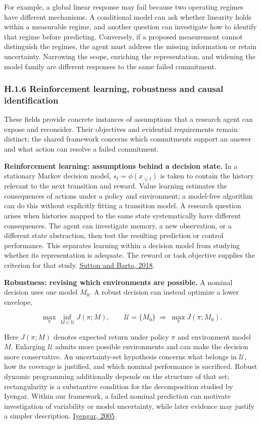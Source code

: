 \documentclass[11pt,a4paper]{article}
\begin{document}
For example, a global linear response may fail because two operating regimes have different mechanisms. A conditional model can ask whether linearity holds within a measurable regime, and another question can investigate how to identify that regime before predicting. Conversely, if a proposed measurement cannot distinguish the regimes, the agent must address the missing information or retain uncertainty. Narrowing the scope, enriching the representation, and widening the model family are different responses to the same failed commitment.


\subsubsection*{H.1.6 Reinforcement learning, robustness and causal identification}

These fields provide concrete instances of assumptions that a research agent can expose and reconsider. Their objectives and evidential requirements remain distinct; the shared framework concerns which commitments support an answer and what action can resolve a failed commitment.


\textbf{Reinforcement learning: assumptions behind a decision state.} In a stationary Markov decision model, \(s_t=\phi(x_{\leq t})\) is taken to contain the history relevant to the next transition and reward. Value learning estimates the consequences of actions under a policy and environment; a model-free algorithm can do this without explicitly fitting a transition model. A research question arises when histories mapped to the same state systematically have different consequences. The agent can investigate memory, a new observation, or a different state abstraction, then test the resulting prediction or control performance. This separates learning within a decision model from studying whether its representation is adequate. The reward or task objective supplies the criterion for that study. \href{https://mitpress.mit.edu/9780262039246/reinforcement-learning/}{Sutton and Barto, 2018}.


\textbf{Robustness: revising which environments are possible.} A nominal decision uses one model \(M_0\). A robust decision can instead optimize a lower envelope,


\[
\max_\pi\inf_{M\in\mathcal U}J(\pi;M),
\qquad
\mathcal U=\{M_0\}\ \Longrightarrow\ \max_\pi J(\pi;M_0).
\]


Here \(J(\pi;M)\) denotes expected return under policy \(\pi\) and environment model \(M\). Enlarging \(\mathcal U\) admits more possible environments and can make the decision more conservative. An uncertainty-set hypothesis concerns what belongs in \(\mathcal U\), how its coverage is justified, and which nominal performance is sacrificed. Robust dynamic programming additionally depends on the structure of that set; rectangularity is a substantive condition for the decomposition studied by Iyengar. Within our framework, a failed nominal prediction can motivate investigation of variability or model uncertainty, while later evidence may justify a simpler description. \href{https://doi.org/10.1287/moor.1040.0129}{Iyengar, 2005}.
\end{document}
